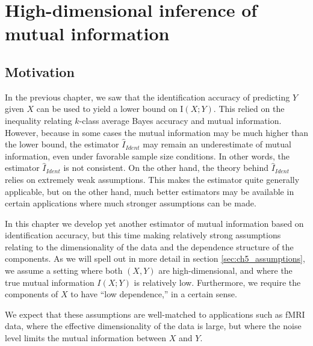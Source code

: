 
\chapter{High-dimensional inference of mutual information} %

\label{Chapter5} %

\section{Motivation}

In the previous chapter, we saw that the identification accuracy of
predicting $Y$ given $X$ can be used to yield a lower bound on
$\text{I}(X; Y)$.  This relied on the inequality relating $k$-class
average Bayes accuracy and mutual information.  However, because in
some cases the mutual information may be much higher than the lower
bound, the estimator $\hat{I}_{Ident}$ may remain an underestimate of
mutual information, even under favorable sample size conditions.  In
other words, the estimator $\hat{I}_{Ident}$ is not consistent.  On the
other hand, the theory behind $\hat{I}_{Ident}$ relies on extremely weak
assumptions.  This makes the estimator quite generally applicable, but
on the other hand, much better estimators may be available in certain
applications where much stronger assumptions can be made.

In this chapter we develop yet another estimator of mutual information
based on identification accuracy, but this time making relatively strong
assumptions relating to the dimensionality of the data and the
dependence structure of the components.  As we will spell out in more
detail in section \ref{sec:ch5_assumptions}, we assume a setting where both
$(X, Y)$ are high-dimensional, and where the true mutual information
$I(X; Y)$ is relatively low.  Furthermore, we require the components
of $X$ to have ``low dependence,'' in a certain sense.

We expect that these assumptions are well-matched to applications such
as fMRI data, where the effective dimensionality of the data is large,
but where the noise level limits the mutual information between $X$
and $Y$.

